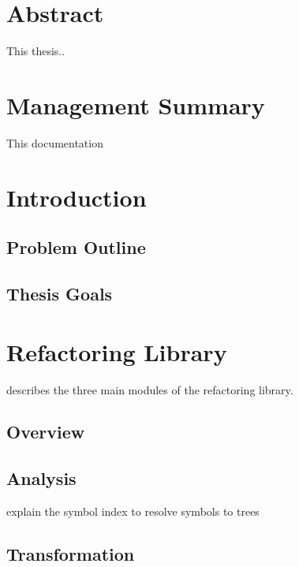 \documentclass[10pt,a4paper,oneside]{scrreprt}
\begin{document}
\newcommand{\subtitlename}{Master's Thesis}
\newcommand{\titlename}{Refactoring for Scala}



\chapter*{Abstract}


This thesis..


\chapter*{Management Summary}

This documentation 

\newpage

\setcounter{tocdepth}{2}

\tableofcontents

\newpage


\chapter{Introduction}
\section{Problem Outline}
\section{Thesis Goals}

\chapter{Refactoring Library}

describes the three main modules of the refactoring library.

\section{Overview}
\section{Analysis}

explain the symbol index to resolve symbols to trees

\section{Transformation}
\end{document}
